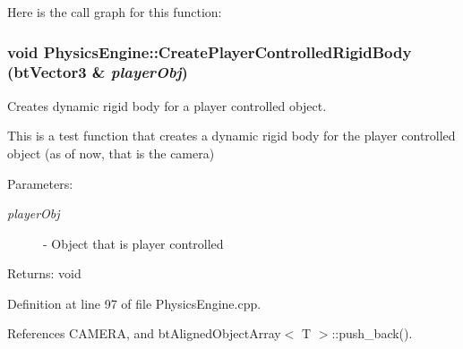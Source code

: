 Here is the call graph for this function:\hypertarget{class_physics_engine_6096d332305e50fba86f377c00ec27e0}{
\subsubsection[CreatePlayerControlledRigidBody]{\setlength{\rightskip}{0pt plus 5cm}void PhysicsEngine::CreatePlayerControlledRigidBody (btVector3 \& {\em playerObj})}}
\label{class_physics_engine_6096d332305e50fba86f377c00ec27e0}


Creates dynamic rigid body for a player controlled object. 

This is a test function that creates a dynamic rigid body for the player controlled object (as of now, that is the camera)

\begin{Desc}
\item[Parameters:]
\begin{description}
\item[{\em playerObj}]- Object that is player controlled\end{description}
\end{Desc}
\begin{Desc}
\item[Returns:]void \end{Desc}


Definition at line 97 of file PhysicsEngine.cpp.

References CAMERA, and btAlignedObjectArray$<$ T $>$::push\_\-back().

